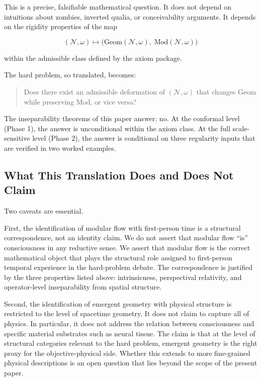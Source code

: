 \documentclass[12pt]{article}
\theoremstyle{definition}
\theoremstyle{remark}
\begin{document}
This is a precise, falsifiable mathematical question. It does not depend
on intuitions about zombies, inverted qualia, or conceivability
arguments. It depends on the rigidity properties of the map

\[
(\mathcal{N},\omega) \longmapsto \big(\mathrm{Geom}(\mathcal{N},\omega),\;\mathrm{Mod}(\mathcal{N},\omega)\big)
\]

within the admissible class defined by the axiom package.

The hard problem, so translated, becomes:

\begin{quote}
Does there exist an admissible deformation of \((\mathcal{N},\omega)\)
that changes \(\mathrm{Geom}\) while preserving \(\mathrm{Mod}\), or
vice versa?
\end{quote}

The inseparability theorems of this paper answer: no. At the conformal
level (Phase 1), the answer is unconditional within the axiom class. At
the full scale-sensitive level (Phase 2), the answer is conditional on
three
regularity inputs that are verified in two worked examples.

\subsection{What This Translation Does and Does Not
Claim}\label{what-this-translation-does-and-does-not-claim}

Two caveats are essential.

First, the identification of modular flow with first-person time is a
structural correspondence, not an identity claim. We do not assert that
modular flow ``is'' consciousness in any reductive sense. We assert that
modular flow is the correct mathematical object that plays the
structural role assigned to first-person temporal experience in the
hard-problem debate. The correspondence is justified by the three
properties listed above: intrinsicness, perspectival relativity, and
operator-level inseparability from spatial structure.

Second, the identification of emergent geometry with physical structure
is restricted to the level of spacetime geometry. It does not claim to
capture all of physics. In particular, it does not address the relation
between consciousness and specific material substrates such as neural
tissue. The claim is that at the level of structural categories relevant
to the hard problem, emergent geometry is the right proxy for the
objective-physical side. Whether this extends to more fine-grained
physical descriptions is an open question that lies beyond the scope of
the present paper.
\end{document}
